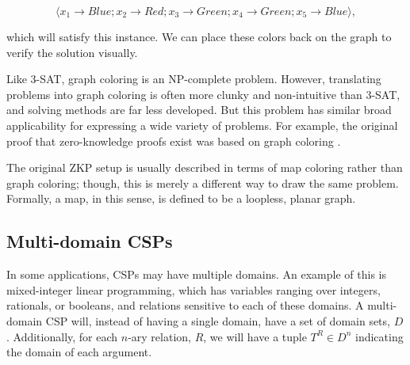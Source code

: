 \begin{equation}
 \langle x_1 \rightarrow Blue; x_2 \rightarrow Red; x_3 \rightarrow Green; x_4 \rightarrow Green; x_5 \rightarrow Blue\rangle,
\end{equation}

which will satisfy this instance. We can place these colors back on the graph to verify the solution visually.

\begin{center}
\end{center}

Like 3-SAT, graph coloring is an NP-complete problem. However, translating problems into graph coloring is often more clunky and non-intuitive than 3-SAT, and solving methods are far less developed. But this problem has similar broad applicability for expressing a wide variety of problems. For example, the original proof that zero-knowledge proofs exist was based on graph coloring \citep{Numberphile2ZKP}.

\begin{remark}\label{remark:graph-map}
The original ZKP setup is usually described in terms of map coloring rather than graph coloring; though, this is merely a different way to draw the same problem. Formally, a map, in this sense, is defined to be a loopless, planar graph.
\end{remark}

\subsection{Multi-domain CSPs}\label{sec:multidomain}

In some applications, CSPs may have multiple domains. An example of this is mixed-integer linear programming, which has variables ranging over integers, rationals, or booleans, and relations sensitive to each of these domains. A multi-domain CSP will, instead of having a single domain, have a set of domain sets, $D$. Additionally, for each $n$-ary relation, $R$, we will have a tuple $T^R \in D^n$ indicating the domain of each argument.

